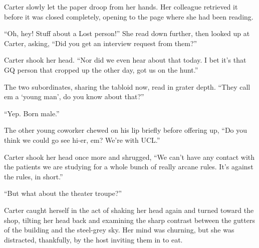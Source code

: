 Carter slowly let the paper droop from her hands. Her colleague retrieved it before it was closed completely, opening to the page where she had been reading.

``Oh, hey! Stuff about a Lost person!'' She read down further, then looked up at Carter, asking, ``Did you get an interview request from them?''

Carter shook her head. ``Nor did we even hear about that today. I bet it's that GQ person that cropped up the other day, got us on the hunt.''

The two subordinates, sharing the tabloid now, read in grater depth. ``They call em a `young man', do you know about that?''

``Yep. Born male.''

The other young coworker chewed on his lip briefly before offering up, ``Do you think we could go see hi-er, em? We're with UCL.''

Carter shook her head once more and shrugged, ``We can't have any contact with the patients we are studying for a whole bunch of really arcane rules. It's against the rules, in short.''

``But what about the theater troupe?''

Carter caught herself in the act of shaking her head again and turned toward the shop, tilting her head back and examining the sharp contrast between the gutters of the building and the steel-grey sky. Her mind was churning, but she was distracted, thankfully, by the host inviting them in to eat.
